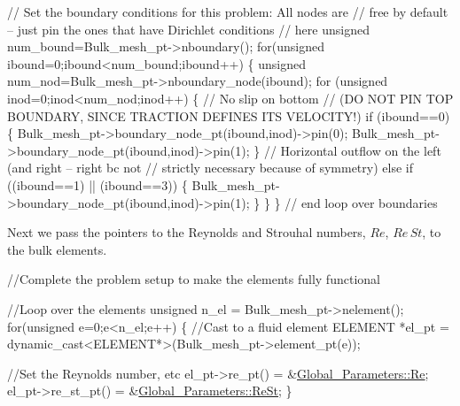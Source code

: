 \begin{DoxyCodeInclude}

 \textcolor{comment}{// Set the boundary conditions for this problem: All nodes are}
 \textcolor{comment}{// free by default -- just pin the ones that have Dirichlet conditions}
 \textcolor{comment}{// here}
 \textcolor{keywordtype}{unsigned} num\_bound=Bulk\_mesh\_pt->nboundary();
 \textcolor{keywordflow}{for}(\textcolor{keywordtype}{unsigned} ibound=0;ibound<num\_bound;ibound++)
  \{
   \textcolor{keywordtype}{unsigned} num\_nod=Bulk\_mesh\_pt->nboundary\_node(ibound);
   \textcolor{keywordflow}{for} (\textcolor{keywordtype}{unsigned} inod=0;inod<num\_nod;inod++)
    \{
     \textcolor{comment}{// No slip on bottom}
     \textcolor{comment}{// (DO NOT PIN TOP BOUNDARY, SINCE TRACTION DEFINES ITS VELOCITY!)}
     \textcolor{keywordflow}{if} (ibound==0)
      \{
       Bulk\_mesh\_pt->boundary\_node\_pt(ibound,inod)->pin(0);
       Bulk\_mesh\_pt->boundary\_node\_pt(ibound,inod)->pin(1);
      \}
     \textcolor{comment}{// Horizontal outflow on the left (and right -- right bc not}
     \textcolor{comment}{// strictly necessary because of symmetry)}
     \textcolor{keywordflow}{else} \textcolor{keywordflow}{if} ((ibound==1) || (ibound==3))
      \{
       Bulk\_mesh\_pt->boundary\_node\_pt(ibound,inod)->pin(1);
      \}
    \}
  \} \textcolor{comment}{// end loop over boundaries}

\end{DoxyCodeInclude}


Next we pass the pointers to the Reynolds and Strouhal numbers, $ Re $, $ Re\, St $, to the bulk elements.


\begin{DoxyCodeInclude}

 \textcolor{comment}{//Complete the problem setup to make the elements fully functional}
 
 \textcolor{comment}{//Loop over the elements}
 \textcolor{keywordtype}{unsigned} n\_el = Bulk\_mesh\_pt->nelement();
 \textcolor{keywordflow}{for}(\textcolor{keywordtype}{unsigned} e=0;e<n\_el;e++)
  \{
   \textcolor{comment}{//Cast to a fluid element}
   ELEMENT *el\_pt = \textcolor{keyword}{dynamic\_cast<}ELEMENT*\textcolor{keyword}{>}(Bulk\_mesh\_pt->element\_pt(e));

   \textcolor{comment}{//Set the Reynolds number, etc}
   el\_pt->re\_pt() = &\hyperlink{namespaceGlobal__Parameters_a9d72e94a9305c6a310940a6a427ebe06}{Global\_Parameters::Re};
   el\_pt->re\_st\_pt() = &\hyperlink{namespaceGlobal__Parameters_a7a59a32365e87566069e458dc83bd18a}{Global\_Parameters::ReSt};
  \}

\end{DoxyCodeInclude}


